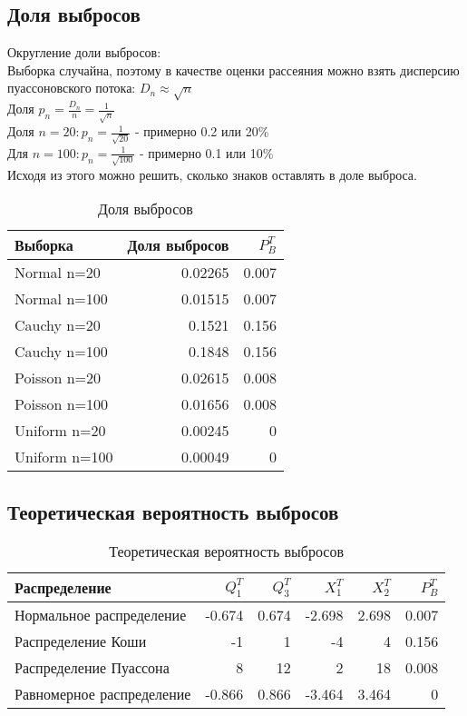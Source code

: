 \documentclass[a4paper]{article}
\begin{document}
\subsection{Доля выбросов}
\noindent Округление доли выбросов:\\
Выборка случайна, поэтому в качестве оценки рассеяния можно взять дисперсию пуассоновского потока:  $D_n \approx \sqrt{n}$\\
Доля $p_n = \frac{D_n}{n}=\frac{1}{\sqrt{n}}$\\
Доля $n=20: p_n=\frac{1}{\sqrt{20}}$ - примерно 0.2 или 20\% \\
Для $n=100: p_n=\frac{1}{\sqrt{100}}$ - примерно 0.1 или 10\% \\
Исходя из этого можно решить, сколько знаков оставлять в доле выброса.
\begin{table}[H]
		\centering
		\begin{tabular}[t]{lrr}
			\hline
			Выборка   &      Доля выбросов	& $P_B^T$		\\
			\hline
			Normal n=20   	&	0.02265 	& 0.007\\
			Normal n=100   	&  	0.01515		& 0.007\\
			Cauchy n=20 	& 	0.1521  	& 0.156\\
			Cauchy n=100	&  	0.1848 		& 0.156\\
			Poisson n=20	&	0.02615 	& 0.008\\
			Poisson n=100	&	0.01656		& 0.008\\
			Uniform n=20	&	0.00245 	& 0 	\\
			Uniform n=100	&	0.00049 	& 0	    \\
			\hline
		\end{tabular}
		\caption{Доля выбросов}
		\label{tab:normal}
	\end{table}
\subsection{Теоретическая вероятность выбросов}
\begin{table}[H]
		\centering
		\begin{tabular}[t]{lrrrrr}
			\hline
			Распределение   &      $Q_1^T$	& $Q_3^T$ & $X_1^T$ & $X_2^T$ & $P_B^T$	\\
			\hline
			Нормальное распределение 	& -0.674& 0.674 & -2.698 	&  2.698 	& 0.007 \\
			Распределение Коши 			& -1	& 1		&  -4		& 4			& 0.156 \\
			Распределение Пуассона 		& 8		& 12	& 2			& 18		& 0.008 \\
			Равномерное распределение 	&-0.866 & 0.866	& -3.464 	& 3.464 	& 0	\\
			
			\hline
		\end{tabular}
		\caption{Теоретическая вероятность выбросов}
		\label{tab:normal}
	\end{table}
\end{document}
